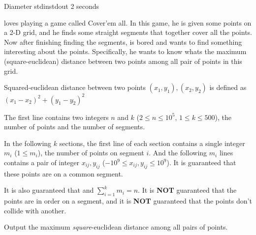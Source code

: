 \begin{problem}{Diameter}
{stdin}{stdout}
{2 seconds}{}{}

\pittoresque loves playing a game called Cover'em all. In this game, he is given some points on a 2-D grid, and he finds some straight segments that together cover all the points. Now after finishing finding the segments, \pittoresque is bored and wants to find something interesting about the points. Specifically, he wants to know whats the maximum (square-euclidean) distance between two points among all pair of points in this grid.

Squared-euclidean distance between two points $(x_1, y_1), (x_2, y_2)$ is defined as $(x_1 - x_2)^2 + (y_1 - y_2)^2$

\InputFile

The first line contains two integers $n$ and $k$ ($2 \le n \le 10^5$, $1 \le k \le 500$), the number of points and the number of segments.

In the following $k$ sections, the first line of each section contains a single integer $m_i$ ($1 \le m_i$), the number of points on segment $i$. And the following $m_i$ lines contains a pair of integer $x_{ij}, y_{ij}$ ($-10^9 \le x_{ij}, y_{ij} \le 10^9$). It is guaranteed that these points are on a common segment.

It is also guaranteed that and $\sum_{i = 1}^{k} m_i = n$. It is \textbf{NOT} guaranteed that the points are in order on a segment, and it is \textbf{NOT} guaranteed that the points don't collide with another. 

\OutputFile

Output the maximum \textit{square}-euclidean distance among all pairs of points. 

\Examples

\begin{example}
%
\end{example}

\begin{example}
%
\end{example}



\end{problem}